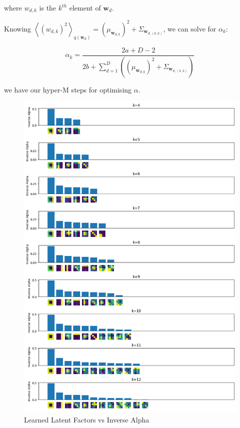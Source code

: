 \documentclass[12pt]{article}
\begin{document}
where $w_{d, k}$ is the $k^{th}$ element of $\textbf{w}_d$.

Knowing $\left\langle (w_{d, k})^2 \right\rangle_{q(\textbf{w}_{d})} = (\mu_{\textbf{w}_{d, k}})^2 + \Sigma_{\textbf{w}_{d, (k, k)}}$, we can solve for $\alpha_k$:

\[ \alpha_k = \frac{2a+D-2}{2b+ \sum_{d=1}^D \left((\mu_{\textbf{w}_{d, k}})^2 + \Sigma_{\textbf{w}_{d, (k, k)}}\right) }\]

we have our hyper-M steps for optimising $\alpha$.

\newpage
\begin{figure}[h]
\centering
\includegraphics[scale=0.47]{outputs/q4/b-1-latent-factors-comparison}
\caption{Learned Latent Factors vs Inverse Alpha}
\label{fig:}
\end{figure}
\end{document}
